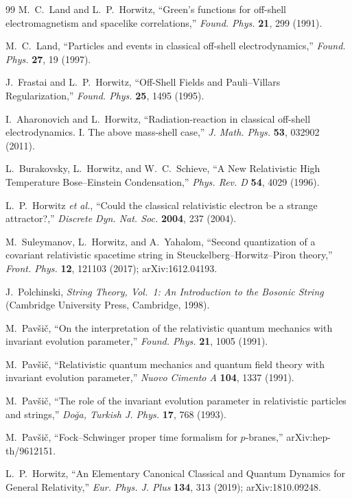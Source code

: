 \documentclass[11pt]{article}
\begin{document}
\begin{thebibliography}{99}
M.~C.~Land and L.~P.~Horwitz, ``Green's functions for off-shell
electromagnetism and spacelike correlations,'' \textit{Found. Phys.}
\textbf{21}, 299 (1991).

M.~C.~Land, ``Particles and events in classical off-shell electrodynamics,''
\textit{Found. Phys.} \textbf{27}, 19 (1997).

J.~Frastai and L.~P.~Horwitz, ``Off-Shell Fields and Pauli--Villars
Regularization,'' \textit{Found. Phys.} \textbf{25}, 1495 (1995).

I.~Aharonovich and L.~Horwitz, ``Radiation-reaction in classical off-shell
electrodynamics. I. The above mass-shell case,'' \textit{J. Math. Phys.}
\textbf{53}, 032902 (2011).

L.~Burakovsky, L.~Horwitz, and W.~C.~Schieve, ``A New Relativistic High
Temperature Bose--Einstein Condensation,'' \textit{Phys. Rev. D} \textbf{54},
4029 (1996).

L.~P.~Horwitz \textit{et al.}, ``Could the classical relativistic electron be
a strange attractor?,'' \textit{Discrete Dyn. Nat. Soc.} \textbf{2004}, 237
(2004).

M.~Suleymanov, L.~Horwitz, and A.~Yahalom, ``Second quantization of a
covariant relativistic spacetime string in Steuckelberg--Horwitz--Piron
theory,'' \textit{Front. Phys.} \textbf{12}, 121103 (2017); arXiv:1612.04193.

J.~Polchinski, \textit{String Theory, Vol.~1: An Introduction to the Bosonic
String} (Cambridge University Press, Cambridge, 1998).

M.~Pavši\v{c}, ``On the interpretation of the relativistic quantum mechanics
with invariant evolution parameter,'' \textit{Found. Phys.} \textbf{21}, 1005
(1991).

M.~Pavši\v{c}, ``Relativistic quantum mechanics and quantum field theory with
invariant evolution parameter,'' \textit{Nuovo Cimento A} \textbf{104}, 1337
(1991).

M.~Pavši\v{c}, ``The role of the invariant evolution parameter in
relativistic particles and strings,'' \textit{Do\u{g}a, Turkish J. Phys.}
\textbf{17}, 768 (1993).

M.~Pavši\v{c}, ``Fock--Schwinger proper time formalism for $p$-branes,''
arXiv:hep-th/9612151.

L.~P.~Horwitz, ``An Elementary Canonical Classical and Quantum Dynamics for
General Relativity,'' \textit{Eur. Phys. J. Plus} \textbf{134}, 313 (2019);
arXiv:1810.09248.

\end{thebibliography}
\end{document}
